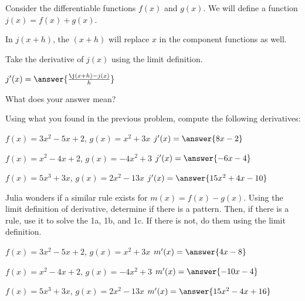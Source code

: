 \documentclass{ximera}
\begin{document}
\begin{question}
Consider the differentiable functions $f(x)$ and $g(x)$. We will define a function $j(x) = f(x) + g(x)$.

\begin{hint}
In $j(x+h)$, the $(x+h)$ will replace $x$ in the component functions as well.
\end{hint}
Take the derivative of $j(x)$ using the limit definition.

$j'(x) =  \answer{\frac{\j(x+h)-j(x)}{h}}$

What does your answer mean?

\begin{freeResponse}
\end{freeResponse}

Using what you found in the previous problem, compute the following derivatives:

$f(x) = 3x^2 - 5x + 2$, $g(x) = x^2 + 3x$ \hspace{10mm} $j'(x) =  \answer{8x-2}$

$f(x) = x^2 - 4x + 2$, $g(x) = -4x^2 + 3$ \hspace{10mm} $j'(x) = \answer{-6x-4}$

$f(x) = 5x^3 + 3x$, $g(x) = 2x^2 - 13x$ \hspace{10mm} $j'(x) =  \answer{15x^2+4x-10}$
\end{question}
\begin{question}
Julia wonders if a similar rule exists for $m(x) = f(x)-g(x)$. Using the limit definition of derivative, determine if there is a pattern. Then, if there is a rule, use it to solve the 1a, 1b, and 1c. If there is not, do them using the limit definition.

$f(x) = 3x^2 - 5x + 2$, $g(x) = x^2 + 3x$ \hspace{10mm} $m'(x) =  \answer{4x-8}$

$f(x) = x^2 - 4x + 2$, $g(x) = -4x^2 + 3$ \hspace{10mm} $m'(x) =  \answer{-10x-4}$

$f(x) = 5x^3 + 3x$, $g(x) = 2x^2 - 13x$ \hspace{10mm} $m'(x) =  \answer{15x^2-4x+16}$
\end{question}
\end{document}
